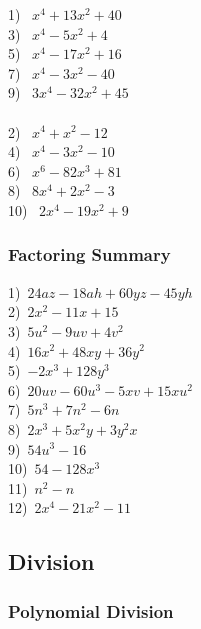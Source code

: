 {}

\begin{multicols}{2}
  1)~ $x^4 +13x^2+40$\\
  3)~ $x^4-5x^2+4$\\
  5)~ $x^4 -17x^2+16$\\
  7)~ $x^4 -3x^2-40$\\
  9)~ $3x^4 -32x^2+45$\\
~\\
	2)~ $x^4 +x^2-12$\\
  4)~ $x^4 -3x^2-10$\\
  6)~ $x^6 -82x^3+81$\\
  8)~ $8x^4 +2x^2-3$\\
  10)~ $2x^4 -19x^2+9$%
  
\end{multicols}

\subsubsection{Factoring Summary}

{}\pp

  1)~$24 a z - 18 a h + 60 y z - 45 y h$\\
  2)~$2 x^2 - 11 x + 15$\\
  3)~$5 u^2 - 9 u v + 4 v^2$\\
  4)~$16 x^2 + 48 x y + 36 y^2$\\
  5)~$- 2 x^3 + 128 y^3$\\
  6)~$20 u v - 60 u^3 - 5 x v + 15 x u^2$\\
  7)~$5 n^3 + 7 n^2 - 6 n$\\
  8)~$2 x^3 + 5 x^2 y + 3 y^2 x$\\
  9)~$54 u^3 - 16$\\
  10)~$54 - 128 x^3$\\
  11)~$n^2 - n$\\
  12)~$2x^4 -21x^2-11$

\newpage

\subsection{Division}
\subsubsection{Polynomial Division}

